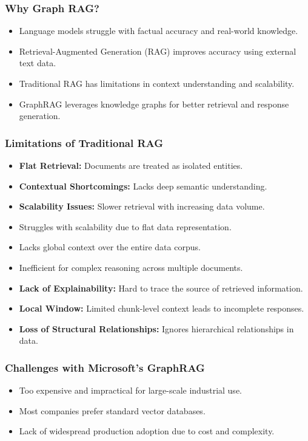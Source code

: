 \begin{frame}[fragile]\frametitle{Why Graph RAG?}
    \begin{itemize}
        \item Language models struggle with factual accuracy and real-world knowledge.
        \item Retrieval-Augmented Generation (RAG) improves accuracy using external text data.
        \item Traditional RAG has limitations in context understanding and scalability.
        \item GraphRAG leverages knowledge graphs for better retrieval and response generation.
    \end{itemize}
\end{frame}

\begin{frame}[fragile]\frametitle{Limitations of Traditional RAG}
    \begin{itemize}
        \item \textbf{Flat Retrieval:} Documents are treated as isolated entities.
        \item \textbf{Contextual Shortcomings:} Lacks deep semantic understanding.
        \item \textbf{Scalability Issues:} Slower retrieval with increasing data volume.
        \item Struggles with scalability due to flat data representation.
        \item Lacks global context over the entire data corpus.
        \item Inefficient for complex reasoning across multiple documents.
        \item \textbf{Lack of Explainability:} Hard to trace the source of retrieved information.
        \item \textbf{Local Window:} Limited chunk-level context leads to incomplete responses.
        \item \textbf{Loss of Structural Relationships:} Ignores hierarchical relationships in data.			
    \end{itemize}
\end{frame}


\begin{frame}[fragile]\frametitle{Challenges with Microsoft's GraphRAG}
    \begin{itemize}
        \item Too expensive and impractical for large-scale industrial use.
        \item Most companies prefer standard vector databases.
        \item Lack of widespread production adoption due to cost and complexity.
    \end{itemize}
\end{frame}

